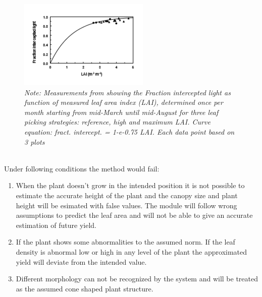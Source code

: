 \begin{figure}[h]
    \centering
    \includegraphics[scale=1.2]{figures/LAI.PNG}
    \caption{\textit{Note: Measurements from \cite{heuvelink2004effect} showing the Fraction intercepted light as function of measured leaf area index (LAI), determined once per month starting from mid-March until mid-August for three leaf picking strategies: reference, high and maximum LAI.  Curve equation: fract. intercept. = 1-e-0.75 LAI.  Each data point based on 3 plots}}
    \label{fig:LaiCurve}
\end{figure}\\

Under following conditions the method would fail:

\begin{enumerate}
    \item When the plant doesn't grow in the intended position it is not possible to estimate the accurate height of the plant and the canopy size and plant height will be esimated with false values. The module will follow wrong assumptions to predict the leaf area and will not be able to give an accurate estimation of future yield.

    \item If the plant shows some abnormalities to the assumed norm. If the leaf density is abnormal low or high in any level of the plant the approximated yield will deviate from the intended value.

    \item Different morphology can not be recognized by the system and will be treated as the assumed cone shaped plant structure.
\end{enumerate}
